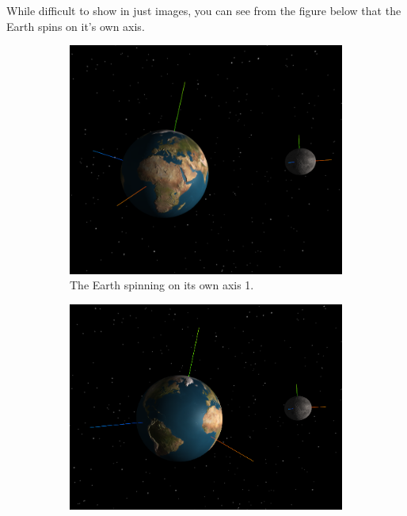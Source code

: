 \documentclass[12pt]{article}
\begin{document}
While difficult to show in just images, you can see from the figure below that the Earth spins on it's own axis.
\begin{figure}[H]
        \centering
        \begin{subfigure}[b]{0.4\textwidth}
                \includegraphics[width=\textwidth]{images/earthandmoonaxisspin1}
                \caption{The Earth spinning on its own axis 1.}
                \label{fig: The axial spin of the Earth 1.}
       \end{subfigure}
        \begin{subfigure}[b]{0.4\textwidth}
                \includegraphics[width=\textwidth]{images/earthandmoonaxisspin2}

\end{subfigure}
\end{figure}
\end{document}
